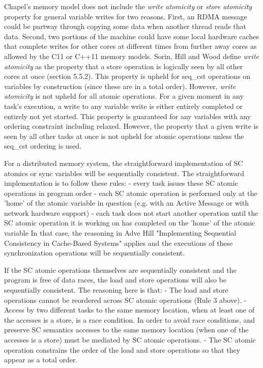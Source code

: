 Chapel's memory model does not include the \textit{write atomicity} or
\textit{store atomicity} property for general variable writes for two reasons.
First, an RDMA message could be partway through copying some data when another
thread reads that data. Second, two portions of the machine could have some
local hardware caches that complete writes for other cores at different times
from further away cores as allowed by the C11 or C++11 memory models. Sorin,
Hill and Wood define \textit{write atomicity} as the property that a store
operation is logically seen by all other cores at once (section 5.5.2). This
property is upheld for seq\_cst operations on  variables by
construction (since these are in a total order). However, \textit{write
atomicity} is not upheld for all atomic operations. For a given moment in any
task's execution, a write to any  variable write is either
entirely completed or entirely not yet started. This property is guaranteed for
any  variables with any ordering constraint including relaxed.
However, the property that a given write is seen by all other tasks at once is
not upheld for atomic operations unless the seq\_cst ordering is used.

For a distributed memory system, the straightforward implementation of SC atomics or sync variables will be sequentially consistent. The straightforward implementation is to follow these rules:
 - every task issues these SC atomic operations in program order
 - each SC atomic operation is performed only at the 'home' of the atomic variable in question (e.g. with an Active Message or with network hardware support)
 - each task does not start another operation until the SC atomic operation it is working on has completed on the 'home' of the atomic variable
In that case, the reasoning in Adve Hill "Implementing Sequential Consistency in Cache-Based Systems" applies and the executions of these synchronization operations will be sequentially consistent.

If the SC atomic operations themselves are sequentially consistent and the
program is free of data races, the load and store operations will also be
sequentially consistent. The reasoning here is that:
 - The load and store operations cannot be reordered across SC atomic operations (Rule 3 above).
 - Access by two different tasks to the same memory location, when at least one of the accesses is a store, is a race condition. In order to avoid race conditions, and preserve SC semantics accesses to the same memory location (when one of the accesses is a store) must be mediated by SC atomic operations.
 - The SC atomic operation constrains the order of the load and store operations so that they appear as a total order.

